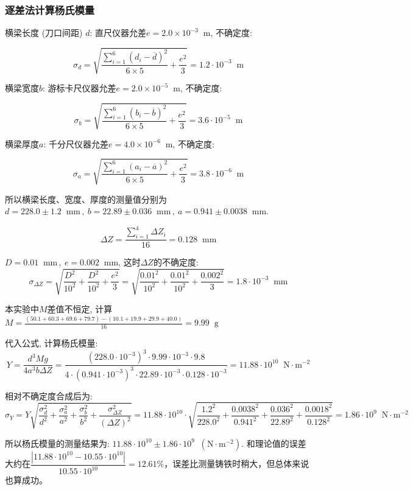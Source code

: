 \documentclass[11pt]{article}
\newcommand*{\unit}[1]{\mathop{}\!\mathrm{#1}}
\begin{document}
\subsubsection{逐差法计算杨氏模量}

横梁长度 (刀口间距) $d$: 直尺仪器允差$e = 2.0\times 10^{-3}\unit{m}$, 不确定度:

\[
    \sigma_d = \sqrt{\frac{\sum_{i=1}^{6} (d_i-\overline{d})^2}{6\times 5} + \frac{e^2}{3}} = 1.2 \cdot 10^{-3} \unit{m}
\]

横梁宽度$b$: 游标卡尺仪器允差$e = 2.0\times 10^{-5}\unit{m}$, 不确定度:

\[
    \sigma_b = \sqrt{\frac{\sum_{i=1}^{6} (b_i-\overline{b})^2}{6\times 5} + \frac{e^2}{3}} = 3.6 \cdot 10^{-5} \unit{m}
\]

横梁厚度$a$: 千分尺仪器允差$e = 4.0\times 10^{-6}\unit{m}$, 不确定度:

\[
    \sigma_a = \sqrt{\frac{\sum_{i=1}^{6} (a_i-\overline{a})^2}{6\times 5} + \frac{e^2}{3}} = 3.8 \cdot 10^{-6}  \unit{m}
\]

所以横梁长度、宽度、厚度的测量值分别为$d = 228.0 \pm 1.2 \unit{mm}\,,\ b = 22.89 \pm 0.036 \unit{mm}\,,\ a = 0.941 \pm 0.0038\unit{mm}$.

\[
    \Delta Z = \frac{\sum_{i=1}^4 \Delta Z_i}{16} = 0.128 \unit{mm}
\]

$D=0.01\unit{mm}\,,\ e = 0.002\unit{mm}$, 这时$\Delta Z$的不确定度: 
\[
    \sigma_{\Delta Z} = \sqrt{\frac{D^2}{10^2} + \frac{D^2}{10^2} + \frac{e^2}{3}} = \sqrt{\frac{0.01^2}{10^2} + \frac{0.01^2}{10^2} + \frac{0.002^2}{3}} = 1.8 \cdot 10^{-3} \unit{mm}
\]

本实验中$M$差值不恒定, 计算$M = \frac{(50.1+60.3+69.6+79.7) - (10.1+19.9+29.9+40.0)}{16} = 9.99 \unit{g}$

代入公式, 计算杨氏模量:
\[
    Y = \frac{d^{3}Mg}{4a^{3}b\Delta Z} = \frac{(228.0 \cdot 10^{-3})^{3} \cdot 9.99 \cdot 10^{-3} \cdot 9.8}{4 \cdot (0.941 \cdot 10^{-3})^{3} \cdot 22.89 \cdot 10^{-3} \cdot 0.128 \cdot 10^{-3}} = 11.88 \cdot 10^{10}  \unit{N \cdot m^{-2}}
\]

相对不确定度合成后为:
\[
    \sigma_Y = Y\sqrt{\frac{\sigma_d^2}{d^2} + \frac{\sigma_a^2}{a^2} + \frac{\sigma_b^2}{b^2} + \frac{\sigma_{\Delta Z}^2}{(\Delta Z)^2}} = 11.88 \cdot 10^{10} \cdot \sqrt{\frac{1.2^2}{228.0^2} + \frac{0.0038^2}{0.941^2} + \frac{0.036^2}{22.89^2} + \frac{0.0018^2}{0.128^2}} = 1.86 \cdot 10^{9} \unit{N \cdot m^{-2}}
\]

所以杨氏模量的测量结果为: $11.88 \cdot 10^{10}  \pm 1.86 \cdot 10^{9} \unit{(N \cdot m^{-2})}$. 和理论值的误差大约在$\dfrac{|11.88 \cdot 10^{10} - 10.55\cdot 10^{10}|}{10.55\cdot 10^{10}} = 12.61 \%$，误差比测量铸铁时稍大，但总体来说也算成功。
\end{document}
